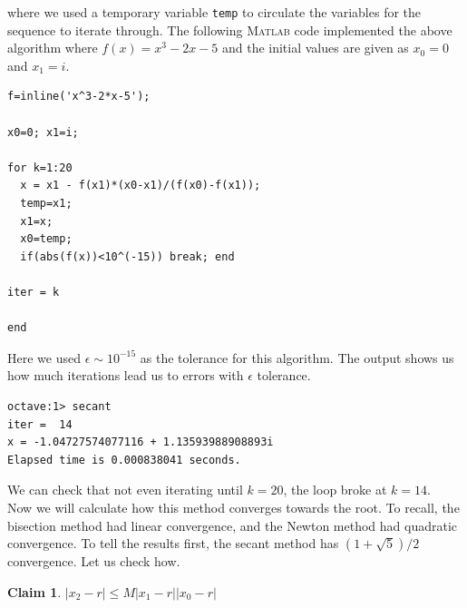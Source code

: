 \documentclass[paper=a4, fontsize=11pt]{scrartcl}
\newcommand{\MATLAB}{\textsc{Matlab}\xspace}
\newtheorem{claim}{Claim}
\begin{document}
where we used a temporary variable \texttt{temp} to circulate the variables for the sequence to iterate through. The following \MATLAB code implemented the above algorithm where $f(x)=x^3-2x-5$ and the initial values are given as $x_0=0$ and $x_1=i$. \\

\begin{lstlisting}[caption = secant.m]
f=inline('x^3-2*x-5');

x0=0; x1=i;

for k=1:20
  x = x1 - f(x1)*(x0-x1)/(f(x0)-f(x1));
  temp=x1;
  x1=x;
  x0=temp;
  if(abs(f(x))<10^(-15)) break; end
  
iter = k

end

\end{lstlisting}
\vspace{0.15in}

Here we used $\epsilon \sim 10^{-15}$ as the tolerance for this algorithm. The output shows us how much iterations lead us to errors with $\epsilon$ tolerance. 

\begin{verbatim}
octave:1> secant
iter =  14
x = -1.04727574077116 + 1.13593988908893i
Elapsed time is 0.000838041 seconds.
\end{verbatim}

We can check that not even iterating until $k=20$, the loop broke at $k=14$. \\

Now we will calculate how this method converges towards the root. To recall, the bisection method had linear convergence, and the Newton method had quadratic convergence. To tell the results first, the secant method has $(1+\sqrt{5})/2$ convergence. Let us check how. \\

\begin{claim}
	$|x_2 - r| \leq M |x_1 - r | |x_0 - r|$
\end{claim}
\end{document}

